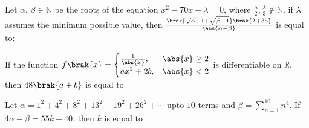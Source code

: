 	\item Let $\alpha$, $\beta \in \mathbb{N}$ be the roots of the equation $x^2-70x+\lambda=0$, where $\frac{\lambda}{2},\frac{\lambda}{3}\notin \mathbb{N}$. if $\lambda$ assumes the minimum possible value, then $\frac{\brak{\sqrt{\alpha-1}+\sqrt{\beta-1}}\brak{\lambda+35}}{\abs{\alpha-\beta}}$ is equal to: \hfill {}
	\item If the function $f\brak{x} = \begin{cases} \frac{1}{\abs{x}},& \abs{x}\geq2\\ ax^2+2b,& \abs{x}<2\end{cases}$ is differentiable on $\mathbb{R}$, then $48\brak{a+b}$ is equal to  \hfill {}
	\item Let $\alpha=1^2+4^2+8^2+13^2+19^2+26^2+\cdots$ upto $10$ terms and $\beta=\sum\limits_{n=1}^{10}n^4$. If $4\alpha-\beta=55k+40$, then $k$ is equal to  \hfill {}
%

